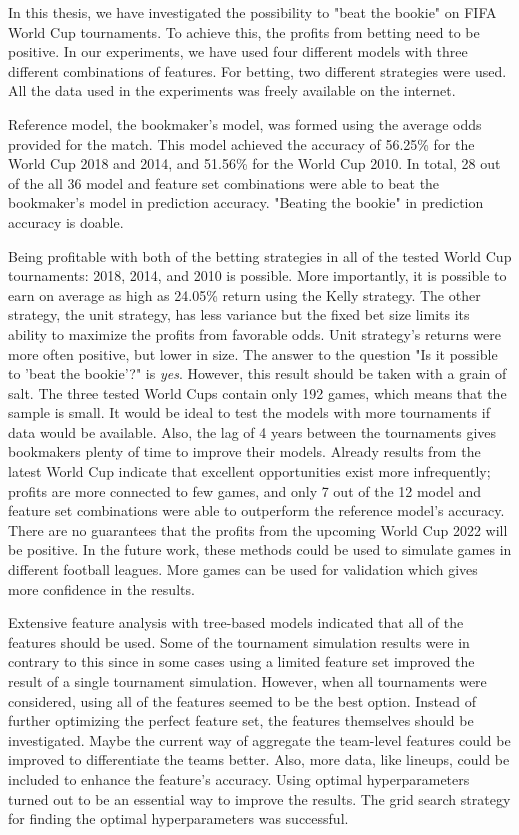 In this thesis, we have investigated the possibility to "beat the bookie" on FIFA World Cup tournaments. To achieve this, the profits from betting need to be positive. In our experiments, we have used four different models with three different combinations of features. For betting, two different strategies were used. All the data used in the experiments was freely available on the internet.

Reference model, the bookmaker's model, was formed using the average odds provided for the match. This model achieved the accuracy of 56.25\% for the World Cup 2018 and 2014, and 51.56\% for the World Cup 2010. In total, 28 out of the all 36 model and feature set combinations were able to beat the bookmaker's model in prediction accuracy. "Beating the bookie" in prediction accuracy is doable.

Being profitable with both of the betting strategies in all of the tested World Cup tournaments: 2018, 2014, and 2010 is possible. More importantly, it is possible to earn on average as high as 24.05\% return using the Kelly strategy. The other strategy, the unit strategy, has less variance but the fixed bet size limits its ability to maximize the profits from favorable odds. Unit strategy's returns were more often positive, but lower in size. The answer to the question
"Is it possible to 'beat the bookie'?" is \textit{yes}. However, this result should be taken with a grain of salt. The three tested World Cups contain only 192 games, which means that the sample is small. It would be ideal to test the models with more tournaments if data would be available.
Also, the lag of 4 years between the tournaments gives bookmakers plenty of time to improve their models. Already results from the latest World Cup indicate that excellent opportunities exist more infrequently; profits are more connected to few games, and only 7 out of the 12 model and feature set combinations were able to outperform the reference model's accuracy. There are no guarantees that the profits from the upcoming World Cup 2022 will be positive. In the future work, these methods could be used to simulate games in different football leagues. More games can be used for validation which gives more confidence in the results.

Extensive feature analysis with tree-based models indicated that all of the features should be used. Some of the tournament simulation results were in contrary to this since in some cases using a limited feature set improved the result of a single tournament simulation. However, when all tournaments were considered, using all of the features seemed to be the best option. Instead of further optimizing the perfect feature set, the features themselves should be investigated. Maybe the current way of aggregate the team-level features could be improved to differentiate the teams better. Also, more data, like lineups, could be included to enhance the feature's accuracy. Using optimal hyperparameters turned out to be an essential way to improve the results. The grid search strategy for finding the optimal hyperparameters was successful.


